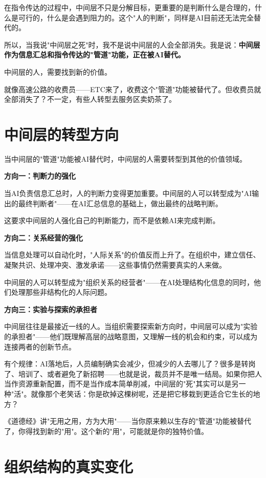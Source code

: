 在指令传达的过程中，中间层不只是分解目标，更重要的是判断什么是合理的，什么是可行的，什么是会遇到阻力的。这个"人的判断"，同样是AI目前还无法完全替代的。

所以，当我说"中间层之死"时，我不是说中间层的人会全部消失。我是说：\textbf{中间层作为信息汇总和指令传达的"管道"功能，正在被AI替代。}

中间层的人，需要找到新的价值。

就像高速公路的收费员——ETC来了，收费这个"管道"功能被替代了。但收费员就全部消失了？不一定，有些人转型去服务区卖奶茶了。

\section{中间层的转型方向}


当中间层的"管道"功能被AI替代时，中间层的人需要转型到其他的价值领域。

\textbf{方向一：判断力的强化}

当AI负责信息汇总时，人的判断力变得更加重要。中间层的人可以转型成为"AI输出的最终判断者"——在AI汇总信息的基础上，做出最终的战略判断。

这要求中间层的人强化自己的判断能力，而不是依赖AI来完成判断。

\textbf{方向二：关系经营的强化}

当信息处理可以自动化时，"人际关系"的价值反而上升了。在组织中，建立信任、凝聚共识、处理冲突、激发承诺——这些事情仍然需要真实的人来做。

中间层的人可以转型成为"组织关系的经营者"——在AI处理结构化信息的同时，他们处理那些非结构化的人际问题。

\textbf{方向三：实验与探索的承担者}

中间层往往是最接近一线的人。当组织需要探索新方向时，中间层可以成为"实验的承担者"——他们既理解高层的战略意图，又理解一线的机会和约束，可以成为连接两者的创新节点。

有个规律：AI落地后，人员编制确实会减少，但减少的人去哪儿了？很多是转岗了、培训了、或者避免了新招聘——也就是说，裁员并不是唯一结局。如果你把人当作资源重新配置，而不是当作成本简单削减，中间层的"死"其实可以是另一种"活"。就像那个老笑话：你是砍掉这棵树呢，还是把它移栽到更适合它生长的地方？

《道德经》讲"无用之用，方为大用"——当你原来赖以生存的"管道"功能被替代了，你得找到新的"用"。这个新的"用"，可能就是你的独特价值。

\section{组织结构的真实变化}



